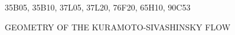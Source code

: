 \documentclass{siamltex}          %
\begin{document}
\begin{AMS}
35B05, 35B10, 37L05, 37L20, 76F20, 65H10, 90C53
\end{AMS}

\pagestyle{myheadings}
\thispagestyle{plain}
         {GEOMETRY OF THE KURAMOTO-SIVASHINSKY FLOW}








\appendix





\end{document}
